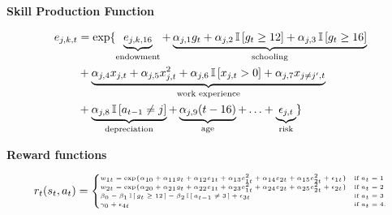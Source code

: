 \begin{frame}\textbf{Skill Production Function}\vspace{0.3cm}

\begin{align*}
e_{j,k,t} & =  \exp\{ \underbrace{e_{j,k,16}}_{\text{endowment}}+ \underbrace{\alpha_{j,1} g_t + \alpha_{j,2} \,\mathbb{I}\,[g_t \geq 12] + \alpha_{j,3} \,\mathbb{I}\,[g_t \geq 16]}_{\text{schooling}}\\
                & + \underbrace{\alpha_{j,4} x_{j,t} + \alpha_{j,5} x^2_{j, t} + \alpha_{j,6} \,\mathbb{I}\,[x_{j, t} > 0] + \alpha_{j,7} x_{j\neq j^\prime, t}}_{\text{work experience}}  \\
                & + \underbrace{\alpha_{j,8}\,\mathbb{I}\,[a_{t - 1} \neq j] }_{\text{depreciation}} + \underbrace{\alpha_{j,9} (t - 16)}_{\text{age}} + \hdots + \underbrace{\epsilon_{j, t}}_{\text{risk}}\}
\end{align*}

\end{frame}
\begin{frame}
  \textbf{Reward functions}\vspace{0.5cm}

  \begin{align*}\tiny
  r_t(s_t, a_t) = \begin{cases} w_{1t} =
  \exp\{\alpha_{10} + \alpha_{11}g_t + \alpha_{12}e_{1t} + \alpha_{13}e^2_{1t} + \alpha_{14}e_{2t} + \alpha_{15}e^2_{2t} + \epsilon_{1t}\} & \text{if}\; a_t = 1 \\
  w_{2t} = \exp\{\alpha_{20} + \alpha_{21}g_t + \alpha_{22}e_{1t} + \alpha_{23}e^2_{1t} + \alpha_{24}e_{2t} + \alpha_{25}e^2_{2t} + \epsilon_{2t}\}& \text{if}\; a_t = 2 \\
  \beta_0 - \beta_1 \,\mathbb{I}\,[\,g_t \geq 12\,] - \beta_2\,\mathbb{I}\,[\,a_{t - 1} \neq 3\,] + \epsilon_{3t}& \text{if}\; a_t = 3 \\
  \gamma_0 + \epsilon_{4t}& \text{if}\; a_t = 4. \\
  \end{cases}
  \end{align*}
\end{frame}
